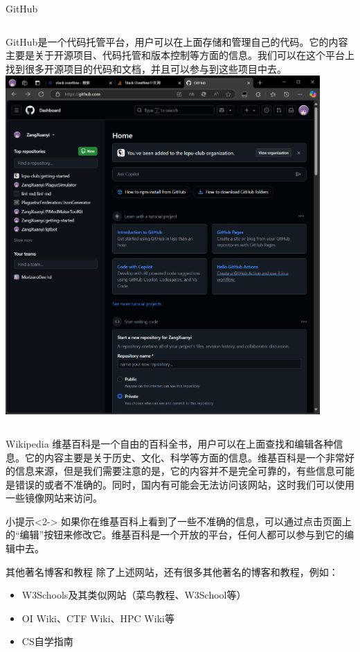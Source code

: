 \documentclass{beamer}
\begin{document}
\begin{frame}{GitHub}
    \begin{columns}[T]
            GitHub是一个代码托管平台，用户可以在上面存储和管理自己的代码。它的内容主要是关于开源项目、代码托管和版本控制等方面的信息。我们可以在这个平台上找到很多开源项目的代码和文档，并且可以参与到这些项目中去。
            \includegraphics[width=0.9\textwidth]{4-5-GitHub.png}
    \end{columns}
\end{frame}

\begin{frame}{Wikipedia}
    维基百科是一个自由的百科全书，用户可以在上面查找和编辑各种信息。它的内容主要是关于历史、文化、科学等方面的信息。维基百科是一个非常好的信息来源，但是我们需要注意的是，它的内容并不是完全可靠的，有些信息可能是错误的或者不准确的。同时，国内有可能会无法访问该网站，这时我们可以使用一些镜像网站来访问。
    \begin{block}{小提示}<2->
        如果你在维基百科上看到了一些不准确的信息，可以通过点击页面上的“编辑”按钮来修改它。维基百科是一个开放的平台，任何人都可以参与到它的编辑中去。
    \end{block}
\end{frame}

\begin{frame}{其他著名博客和教程}
    除了上述网站，还有很多其他著名的博客和教程，例如：
    \begin{itemize}
        \item <2->W3Schools及其类似网站（菜鸟教程、W3School等）
        \item <3->OI Wiki、CTF Wiki、HPC Wiki等
        \item <4->CS自学指南
    \end{itemize}
\end{frame}
\end{document}
